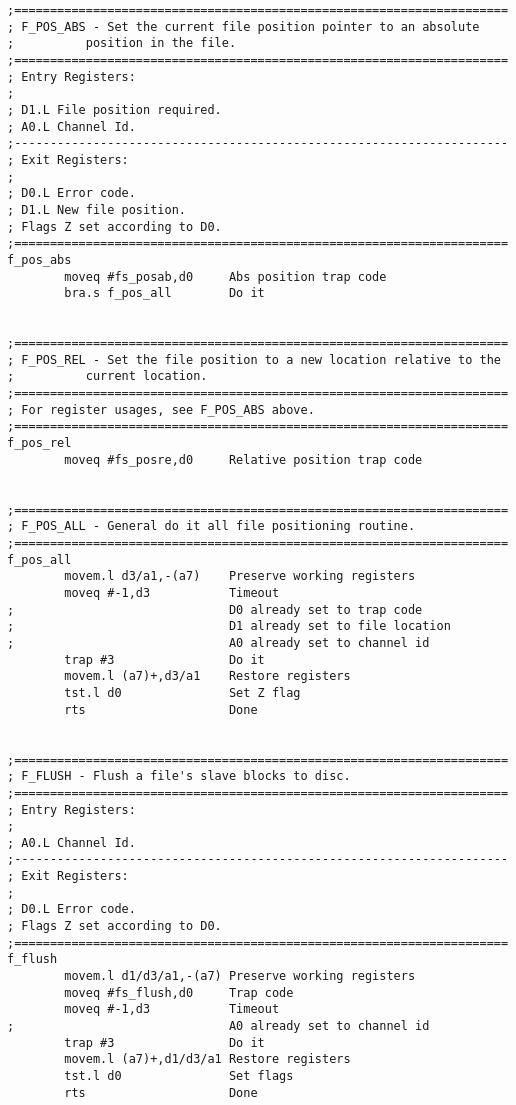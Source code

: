 \begin{lstlisting}[firstnumber=1,]
;=====================================================================
; F_POS_ABS - Set the current file position pointer to an absolute
;          position in the file.
;=====================================================================
; Entry Registers:
;
; D1.L File position required.
; A0.L Channel Id.
;---------------------------------------------------------------------
; Exit Registers:
;
; D0.L Error code.
; D1.L New file position.
; Flags Z set according to D0.
;=====================================================================
f_pos_abs
        moveq #fs_posab,d0     Abs position trap code
        bra.s f_pos_all        Do it


;=====================================================================
; F_POS_REL - Set the file position to a new location relative to the
;          current location.
;=====================================================================
; For register usages, see F_POS_ABS above.
;=====================================================================
f_pos_rel
        moveq #fs_posre,d0     Relative position trap code


;=====================================================================
; F_POS_ALL - General do it all file positioning routine.
;=====================================================================
f_pos_all
        movem.l d3/a1,-(a7)    Preserve working registers
        moveq #-1,d3           Timeout
;                              D0 already set to trap code
;                              D1 already set to file location
;                              A0 already set to channel id
        trap #3                Do it
        movem.l (a7)+,d3/a1    Restore registers
        tst.l d0               Set Z flag
        rts                    Done


;=====================================================================
; F_FLUSH - Flush a file's slave blocks to disc.
;=====================================================================
; Entry Registers:
;
; A0.L Channel Id.
;---------------------------------------------------------------------
; Exit Registers:
;
; D0.L Error code.
; Flags Z set according to D0.
;=====================================================================
f_flush
        movem.l d1/d3/a1,-(a7) Preserve working registers
        moveq #fs_flush,d0     Trap code
        moveq #-1,d3           Timeout
;                              A0 already set to channel id
        trap #3                Do it
        movem.l (a7)+,d1/d3/a1 Restore registers
        tst.l d0               Set flags
        rts                    Done
\end{lstlisting}

